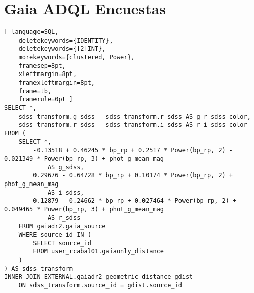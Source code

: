 \chapter{Gaia ADQL Encuestas}

\begin{lstlisting}[ language=SQL,
	deletekeywords={IDENTITY},
	deletekeywords={[2]INT},
	morekeywords={clustered, Power},
	framesep=8pt,
	xleftmargin=8pt,
	framexleftmargin=8pt,
	frame=tb,
	framerule=0pt ]
SELECT *,
	sdss_transform.g_sdss - sdss_transform.r_sdss AS g_r_sdss_color,
	sdss_transform.r_sdss - sdss_transform.i_sdss AS r_i_sdss_color
FROM (
	SELECT *,
		-0.13518 + 0.46245 * bp_rp + 0.2517 * Power(bp_rp, 2) - 0.021349 * Power(bp_rp, 3) + phot_g_mean_mag
			AS g_sdss,
		0.29676 - 0.64728 * bp_rp + 0.10174 * Power(bp_rp, 2) + phot_g_mean_mag
			AS i_sdss,
		0.12879 - 0.24662 * bp_rp + 0.027464 * Power(bp_rp, 2) + 0.049465 * Power(bp_rp, 3) + phot_g_mean_mag
			AS r_sdss
	FROM gaiadr2.gaia_source
	WHERE source_id IN (
		SELECT source_id
		FROM user_rcabal01.gaiaonly_distance
	)
) AS sdss_transform
INNER JOIN EXTERNAL.gaiadr2_geometric_distance gdist
	ON sdss_transform.source_id = gdist.source_id 
\end{lstlisting}